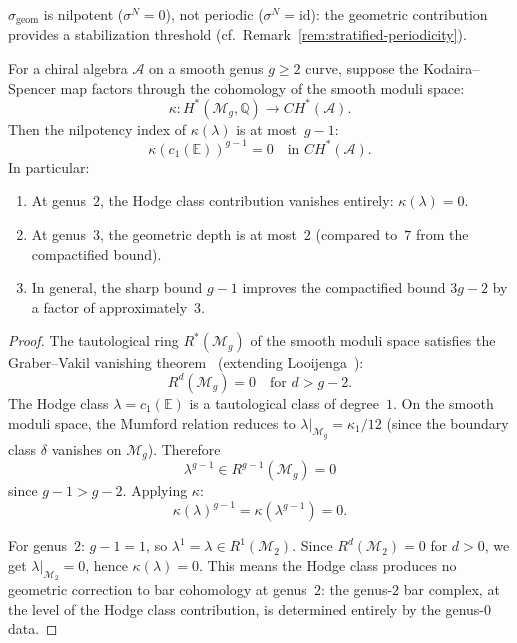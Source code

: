\begin{remark}
\label{rem:nilpotent-vs-periodic}
$\sigma_{\mathrm{geom}}$ is nilpotent ($\sigma^N = 0$), not periodic ($\sigma^N = \mathrm{id}$): the geometric contribution provides a stabilization threshold (cf.\ Remark~\ref{rem:stratified-periodicity}).
\end{remark}

\begin{theorem}
\label{thm:geometric-depth-smooth}
For a chiral algebra $\mathcal{A}$ on a smooth genus $g \geq 2$
curve, suppose the Kodaira--Spencer map factors through the
cohomology of the smooth moduli space:
\[
\kappa \colon H^*(\mathcal{M}_g, \mathbb{Q}) \longrightarrow
CH^*(\mathcal{A}).
\]
Then the nilpotency index of $\kappa(\lambda)$ is at most~$g - 1$:
\begin{equation}\label{eq:sharp-geometric-depth}
\kappa(c_1(\mathbb{E}))^{g-1} = 0
\quad \text{in } CH^*(\mathcal{A}).
\end{equation}
In particular:
\begin{enumerate}[label=\textup{(\alph*)}]
\item At genus~$2$, the Hodge class contribution vanishes entirely:
  $\kappa(\lambda) = 0$.
\item At genus~$3$, the geometric depth is at most~$2$
  (compared to~$7$ from the compactified bound).
\item In general, the sharp bound $g - 1$ improves the
  compactified bound $3g - 2$ by a factor of approximately~$3$.
\end{enumerate}
\end{theorem}

\begin{proof}
The tautological ring $R^*(\mathcal{M}_g)$ of the smooth
moduli space satisfies the Graber--Vakil vanishing
theorem~\cite{GraVak05} (extending Looijenga~\cite{Looij95}):
\begin{equation}\label{eq:graber-vakil-vanishing}
R^d(\mathcal{M}_g) = 0 \quad \text{for } d > g - 2.
\end{equation}
The Hodge class $\lambda = c_1(\mathbb{E})$ is a
tautological class of degree~$1$.
On the smooth moduli space, the Mumford relation reduces to
$\lambda|_{\mathcal{M}_g} = \kappa_1/12$
(since the boundary class $\delta$ vanishes on
$\mathcal{M}_g$).  Therefore
\[
\lambda^{g-1} \in R^{g-1}(\mathcal{M}_g) = 0
\]
since $g - 1 > g - 2$.  Applying $\kappa$:
\[
\kappa(\lambda)^{g-1} = \kappa(\lambda^{g-1}) = 0.
\]

For genus~$2$: $g - 1 = 1$, so $\lambda^1 = \lambda \in
R^1(\mathcal{M}_2)$.  Since $R^d(\mathcal{M}_2) = 0$ for
$d > 0$, we get $\lambda|_{\mathcal{M}_2} = 0$, hence
$\kappa(\lambda) = 0$.
This means the Hodge class produces no geometric correction
to bar cohomology at genus~$2$: the genus-$2$ bar complex, at
the level of the Hodge class contribution, is determined
entirely by the genus-$0$ data.
\end{proof}

